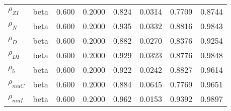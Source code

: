 \begin{center}
\begin{longtable}{llcccccc}
${\rho_{ZI}}$ & beta &   0.600 & 0.2000 &   0.824& 0.0314 &  0.7709 &  0.8744 \\ 
${\rho_N}$ & beta &   0.600 & 0.2000 &   0.935& 0.0332 &  0.8816 &  0.9843 \\ 
${\rho_D}$ & beta &   0.600 & 0.2000 &   0.882& 0.0270 &  0.8376 &  0.9254 \\ 
${\rho_{DI}}$ & beta &   0.600 & 0.2000 &   0.929& 0.0323 &  0.8776 &  0.9848 \\ 
${\rho_b}$ & beta &   0.600 & 0.2000 &   0.922& 0.0242 &  0.8827 &  0.9614 \\ 
${\rho_{muC}}$ & beta &   0.600 & 0.2000 &   0.884& 0.0645 &  0.7769 &  0.9651 \\ 
${\rho_{muI}}$ & beta &   0.600 & 0.2000 &   0.962& 0.0153 &  0.9392 &  0.9897 \\ 
\end{longtable}
 \end{center}
